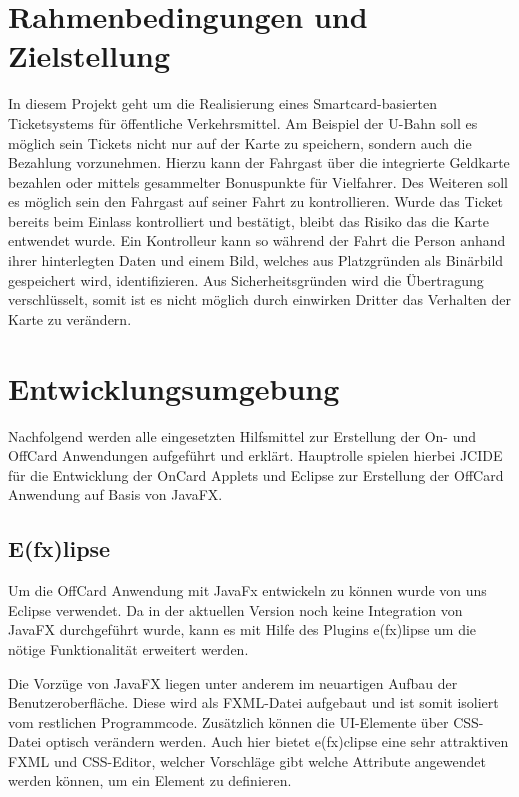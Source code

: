 \documentclass[	a4paper,
			11pt,
			oneside,
			parskip]{scrartcl}
\begin{document}
	
\setlength{\parindent}{0pt} 
\onehalfspacing

\tableofcontents 
\newpage

\section{Rahmenbedingungen und Zielstellung}

In diesem Projekt geht um die Realisierung eines Smartcard-basierten Ticketsystems für öffentliche Verkehrsmittel. Am Beispiel der U-Bahn soll es möglich sein Tickets nicht nur auf der Karte zu speichern, sondern auch die Bezahlung vorzunehmen. Hierzu kann der Fahrgast über die integrierte Geldkarte bezahlen oder mittels gesammelter Bonuspunkte für Vielfahrer. Des Weiteren soll es möglich sein den Fahrgast auf seiner Fahrt zu kontrollieren. Wurde das Ticket bereits beim Einlass kontrolliert und bestätigt, bleibt das Risiko das die Karte entwendet wurde. Ein Kontrolleur kann so während der Fahrt die Person anhand ihrer hinterlegten Daten und einem Bild, welches aus Platzgründen als Binärbild gespeichert wird, identifizieren. Aus Sicherheitsgründen wird die Übertragung verschlüsselt, somit ist es nicht möglich durch einwirken Dritter das Verhalten der Karte zu verändern.

\section{Entwicklungsumgebung}

Nachfolgend werden alle eingesetzten Hilfsmittel zur Erstellung der On- und OffCard Anwendungen aufgeführt und erklärt. Hauptrolle spielen hierbei JCIDE für die Entwicklung der OnCard Applets und Eclipse zur Erstellung der OffCard Anwendung auf Basis von JavaFX.

\subsection{E(fx)lipse}

Um die OffCard Anwendung mit JavaFx entwickeln zu können wurde von uns Eclipse verwendet. Da in der aktuellen Version noch keine Integration von JavaFX durchgeführt wurde, kann es mit Hilfe des Plugins e(fx)lipse um die nötige Funktionalität erweitert werden. \medskip

Die Vorzüge von JavaFX liegen unter anderem im neuartigen Aufbau der Benutzeroberfläche. Diese wird als FXML-Datei aufgebaut und ist somit isoliert vom restlichen Programmcode. Zusätzlich können die UI-Elemente über CSS-Datei optisch verändern werden. Auch hier bietet e(fx)clipse eine sehr attraktiven FXML und CSS-Editor, welcher Vorschläge gibt welche Attribute angewendet werden können, um ein Element zu definieren. 
\end{document}

